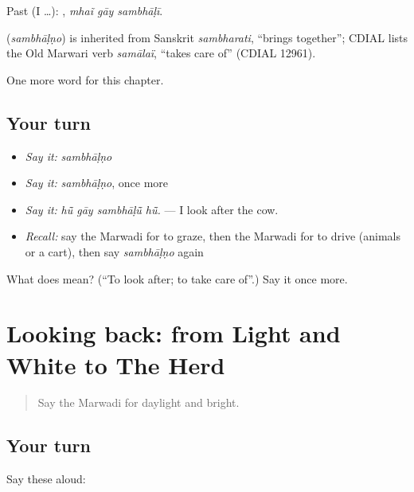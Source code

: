 Past (I …):   , \emph{mhaĩ gāy sambhāḷī}.

\begin{cousinweb}
\textbf{} (\emph{sambhāḷṇo}) is inherited from Sanskrit \emph{sambharati}, \textquotedblleft{}brings together\textquotedblright{}; CDIAL lists the Old Marwari verb \emph{samālaï}, \textquotedblleft{}takes care of\textquotedblright{} (CDIAL 12961).
\end{cousinweb}

\begin{grammarlens}[title={What you've built}]
One more word for this chapter.
\end{grammarlens}

\subsection*{Your turn}
\begin{itemize}
\raggedright
  \item \emph{Say it:} \emph{sambhāḷṇo}
  \item \emph{Say it:} \emph{sambhāḷṇo}, once more
  \item \emph{Say it:} \emph{hū̃ gāy sambhāḷū̃ hū̃.} — I look after the cow.
  \item \emph{Recall:} say the Marwadi for to graze, then the Marwadi for to drive (animals or a cart), then say \emph{sambhāḷṇo} again
\end{itemize}

\begin{tcolorbox}[breakable,colback=teal!4,colframe=teal!35!black,title={Before you move on}]
What does  mean? (\textquotedblleft{}To look after; to take care of\textquotedblright{}.) Say it once more.
\end{tcolorbox}
\section[(dialogue)]{Looking back: from Light and White to The Herd}

\label{lesson:MW-R234-review-229-234}



\begin{quote}
Say the Marwadi for daylight and bright.
\end{quote}

\subsection*{Your turn}
Say these aloud:

